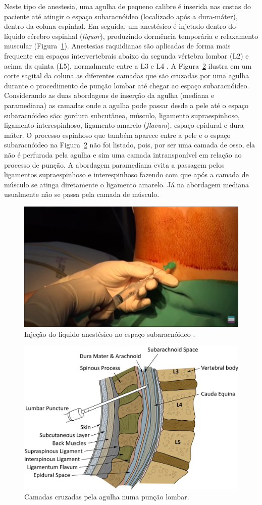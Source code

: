 Neste tipo de anestesia, uma agulha de pequeno calibre é inserida nas costas do paciente até atingir o espaço subaracnóideo (localizado após a dura-máter), dentro da coluna espinhal. Em seguida, um anestésico é injetado dentro do líquido cérebro espinhal (\textit{líquor}), produzindo dormência temporária e relaxamento muscular (Figura~\ref{fig:injecaoAnestesico}). Anestesias raquidianas são aplicadas de forma mais frequente em espaços intervertebrais abaixo da segunda vértebra lombar (L2) e acima da quinta (L5), normalmente entre a L3 e L4 \cite{Wikipedia2019, Londero2018}. A Figura~\ref{fig:camadasPuncaoLombar} ilustra em um corte sagital da coluna as diferentes camadas que são cruzadas por uma agulha durante o procedimento de punção lombar até chegar ao espaço subaracnóideo. Considerando as duas abordagens de inserção da agulha (mediana e paramediana) as camadas onde a agulha pode passar desde a pele até o espaço subaracnóideo são: gordura subcutânea, músculo, ligamento supraespinhoso, ligamento interespinhoso, ligamento amarelo (\textit{flavum}), espaço epidural e dura-máter. O processo espinhoso que também aparece entre a pele e o espaço subaracnóideo na Figura~\ref{fig:camadasPuncaoLombar} não foi listado, pois, por ser uma camada de osso, ela não é perfurada pela agulha e sim uma camada intransponível em relação ao processo de punção. A abordagem paramediana evita a passagem pelos ligamentos supraespinhoso e interespinhoso fazendo com que após a camada de músculo se atinga diretamente o ligamento amarelo. Já na abordagem mediana usualmente não se passa pela camada de músculo.

\begin{figure}[ht!]
    \centering
    \includegraphics[width=0.6\linewidth]{capitulos/figuras/4.InjecaoAnestesico.png}
    \caption{Injeção do liquido anestésico no espaço subaracnóideo  \cite{Londero2018}.}
    \label{fig:injecaoAnestesico}
\end{figure}

\begin{figure}[ht!]
    \centering
    \includegraphics[width=0.6\linewidth]{capitulos/figuras/lumbar.puncture.tisssues.jpeg}
    \caption{Camadas cruzadas pela agulha numa punção lombar.}
    \label{fig:camadasPuncaoLombar}
\end{figure}

